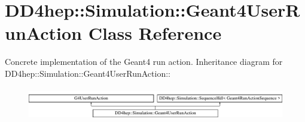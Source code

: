 \hypertarget{class_d_d4hep_1_1_simulation_1_1_geant4_user_run_action}{
\section{DD4hep::Simulation::Geant4UserRunAction Class Reference}
\label{class_d_d4hep_1_1_simulation_1_1_geant4_user_run_action}
}


Concrete implementation of the Geant4 run action.  
Inheritance diagram for DD4hep::Simulation::Geant4UserRunAction::\begin{figure}[H]
\begin{center}
\leavevmode
\includegraphics[height=1.4433cm]{class_d_d4hep_1_1_simulation_1_1_geant4_user_run_action}
\end{center}
\end{figure}
